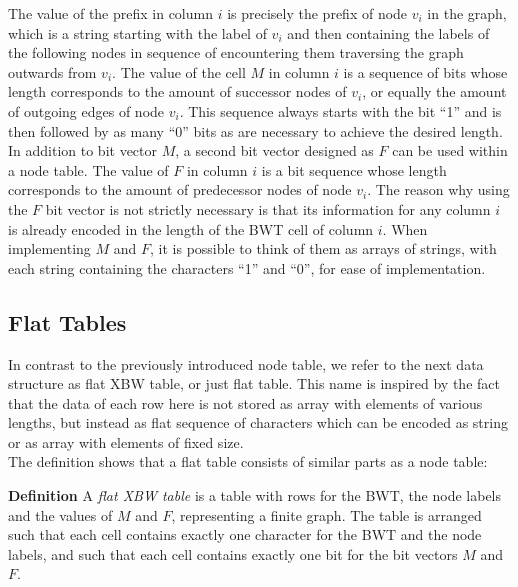 \documentclass[a4paper,12pt,twoside,BCOR=10mm]{scrbook}
\begin{document}
The value of the prefix in column $ i $ is precisely the prefix of node $ v_i $ in the graph, 
which is a string starting with the label of $ v_i $ and then containing 
the labels of the following nodes in sequence of encountering them traversing 
the graph outwards from $ v_i $.
The value of the cell $ M $ in column $ i $ is a sequence of bits whose length corresponds to 
the amount of successor nodes of $ v_i $, or equally the amount of outgoing edges of node $ v_i $. 
This sequence always starts with the bit “1” and is then followed 
by as many “0” bits as are necessary to achieve the desired length. 
In addition to bit vector $ M $, a second bit vector designed as $ F $ can be used within a node table. 
The value of $ F $ in column $ i $ is a bit sequence whose length corresponds to 
the amount of predecessor nodes of node $ v_i $. 
The reason why using the $ F $ bit vector is not strictly necessary is that its information 
for any column $ i $ is already encoded in the length of the BWT cell of column $ i $. 
When implementing $ M $ and $ F $, it is possible to think of them as arrays of strings, 
with each string containing the characters “1” and “0”, for ease of implementation.

\subsection{Flat Tables}
\label{sec:flat_table_definition}

In contrast to the previously introduced node table, 
we refer to the next data structure as flat XBW table, or just flat table. 
This name is inspired by the fact that the data of each row here is not 
stored as array with elements of various lengths, 
but instead as flat sequence of characters which can be encoded as string 
or as array with elements of fixed size. \\
The definition shows that a flat table consists of similar parts as a node table:

\textbf{Definition} A \textit{flat XBW table}\label{def:flat_table} is a table with rows for the BWT, 
the node labels and the values of $ M $ and $ F $, 
representing a finite graph. 
The table is arranged such that each cell contains exactly one character 
for the BWT and the node labels, and such that each cell contains exactly 
one bit for the bit vectors $ M $ and $ F $.
\end{document}
